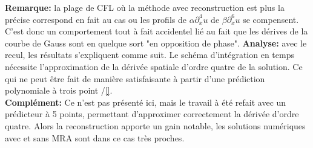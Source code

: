 \textbf{Remarque:} la plage de CFL où la méthode avec reconstruction est plus la précise correspond en fait au cas ou les profils de $ \alpha \partial_x^4 u$
de $\beta \partial_x^6 u$ se compensent. C'est donc un comportement tout à fait accidentel lié au fait que les dérives de la courbe de Gauss sont en quelque sort "en opposition de phase".
\textbf{Analyse:} avec le recul, les résultats s'expliquent comme suit. Le schéma d'intégration en temps nécessite l'approximation de la dérivée spatiale d'ordre quatre de la solution.
Ce qui ne peut être fait de manière satisfaisante à partir d'une prédiction polynomiale à trois point \cite{}/\ref{}.\\
\textbf{Complément:} Ce n'est pas présenté ici, mais le travail à été refait avec un prédicteur à 5 points, permettant d'approximer correctement la dérivée d'ordre quatre.
Alors la reconstruction apporte un gain notable, les solutions numériques avec et sans MRA sont dans ce cas très proches.